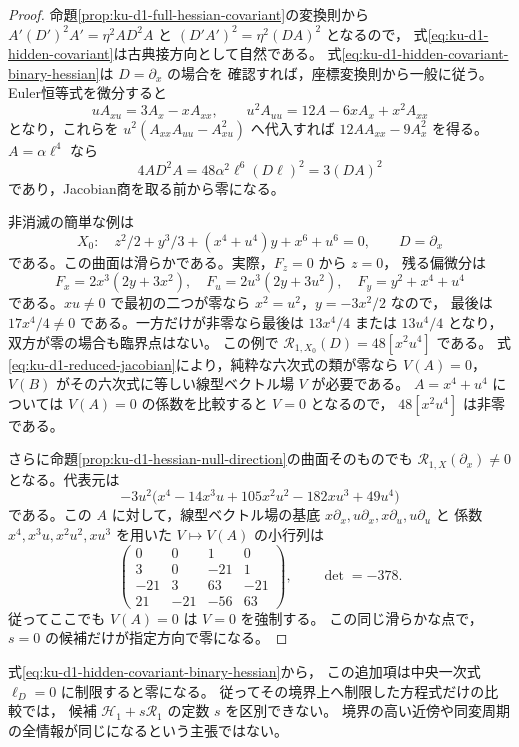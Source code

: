 \begin{proof}
命題\ref{prop:ku-d1-full-hessian-covariant}の変換則から
$A'(D')^2A'=\eta^2A D^2A$ と $(D'A')^2=\eta^2(DA)^2$ となるので，
式\eqref{eq:ku-d1-hidden-covariant}は古典接方向として自然である。
式\eqref{eq:ku-d1-hidden-covariant-binary-hessian}は $D=\partial_x$ の場合を
確認すれば，座標変換則から一般に従う。
Euler恒等式を微分すると
\[
 uA_{xu}=3A_x-xA_{xx},\qquad
 u^2A_{uu}=12A-6xA_x+x^2A_{xx}
\]
となり，これらを $u^2(A_{xx}A_{uu}-A_{xu}^2)$ へ代入すれば
$12AA_{xx}-9A_x^2$ を得る。
$A=\alpha\ell^4$ なら
\[
 4A D^2A=48\alpha^2\ell^6(D\ell)^2=3(DA)^2
\]
であり，Jacobian商を取る前から零になる。

非消滅の簡単な例は
\[
 X_0:\quad z^2/2+y^3/3+(x^4+u^4)y+x^6+u^6=0,
 \qquad D=\partial_x
\]
である。この曲面は滑らかである。実際，$F_z=0$ から $z=0$，
残る偏微分は
\[
 F_x=2x^3(2y+3x^2),\quad F_u=2u^3(2y+3u^2),
 \quad F_y=y^2+x^4+u^4
\]
である。$xu\ne0$ で最初の二つが零なら $x^2=u^2$，$y=-3x^2/2$ なので，
最後は $17x^4/4\ne0$ である。一方だけが非零なら最後は
$13x^4/4$ または $13u^4/4$ となり，双方が零の場合も臨界点はない。
この例で $\mathcal R_{1,X_0}(D)=48[x^2u^4]$ である。
式\eqref{eq:ku-d1-reduced-jacobian}により，純粋な六次式の類が零なら
$V(A)=0$，$V(B)$ がその六次式に等しい線型ベクトル場 $V$ が必要である。
$A=x^4+u^4$ については $V(A)=0$ の係数を比較すると $V=0$ となるので，
$48[x^2u^4]$ は非零である。

さらに命題\ref{prop:ku-d1-hessian-null-direction}の曲面そのものでも
$\mathcal R_{1,X}(\partial_x)\ne0$ となる。代表元は
\[
 -3u^2\bigl(x^4-14x^3u+105x^2u^2-182xu^3+49u^4\bigr)
\]
である。この $A$ に対して，線型ベクトル場の基底
$x\partial_x,u\partial_x,x\partial_u,u\partial_u$ と
係数 $x^4,x^3u,x^2u^2,xu^3$ を用いた $V\mapsto V(A)$ の小行列は
\[
 \begin{pmatrix}
 0&0&1&0\\
 3&0&-21&1\\
 -21&3&63&-21\\
 21&-21&-56&63
 \end{pmatrix},\qquad\det=-378.
\]
従ってここでも $V(A)=0$ は $V=0$ を強制する。
この同じ滑らかな点で，$s=0$ の候補だけが指定方向で零になる。
\end{proof}

式\eqref{eq:ku-d1-hidden-covariant-binary-hessian}から，
この追加項は中央一次式 $\ell_D=0$ に制限すると零になる。
従ってその境界上へ制限した方程式だけの比較では，
候補 $\mathcal H_1+s\mathcal R_1$ の定数 $s$ を区別できない。
境界の高い近傍や同変周期の全情報が同じになるという主張ではない。


